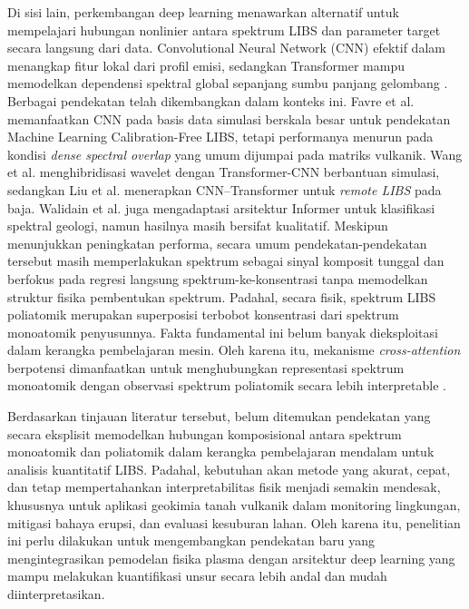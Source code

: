 Di sisi lain, perkembangan deep learning menawarkan alternatif untuk mempelajari hubungan nonlinier antara spektrum LIBS dan parameter target secara langsung dari data. Convolutional Neural Network (CNN) efektif dalam menangkap fitur lokal dari profil emisi, sedangkan Transformer mampu memodelkan dependensi spektral global sepanjang sumbu panjang gelombang \citep{liu_remote_2026}. Berbagai pendekatan telah dikembangkan dalam konteks ini. Favre et al. \citep{favre_towards_2025} memanfaatkan CNN pada basis data simulasi berskala besar untuk pendekatan Machine Learning Calibration-Free LIBS, tetapi performanya menurun pada kondisi \textit{dense spectral overlap} yang umum dijumpai pada matriks vulkanik. Wang et al. \citep{wang_simulation_2024} menghibridisasi wavelet dengan Transformer-CNN berbantuan simulasi, sedangkan Liu et al. \citep{liu_remote_2026} menerapkan CNN--Transformer untuk \textit{remote LIBS} pada baja. Walidain et al. \citep{walidain_informer-based_2026} juga mengadaptasi arsitektur Informer untuk klasifikasi spektral geologi, namun hasilnya masih bersifat kualitatif. Meskipun menunjukkan peningkatan performa, secara umum pendekatan-pendekatan tersebut masih memperlakukan spektrum sebagai sinyal komposit tunggal dan berfokus pada regresi langsung spektrum-ke-konsentrasi tanpa memodelkan struktur fisika pembentukan spektrum. Padahal, secara fisik, spektrum LIBS poliatomik merupakan superposisi terbobot konsentrasi dari spektrum monoatomik penyusunnya. Fakta fundamental ini belum banyak dieksploitasi dalam kerangka pembelajaran mesin. Oleh karena itu, mekanisme \textit{cross-attention} berpotensi dimanfaatkan untuk menghubungkan representasi spektrum monoatomik dengan observasi spektrum poliatomik secara lebih interpretable \citep{vaswani_attention_2017}.

Berdasarkan tinjauan literatur tersebut, belum ditemukan pendekatan yang secara eksplisit memodelkan hubungan komposisional antara spektrum monoatomik dan poliatomik dalam kerangka pembelajaran mendalam untuk analisis kuantitatif LIBS. Padahal, kebutuhan akan metode yang akurat, cepat, dan tetap mempertahankan interpretabilitas fisik menjadi semakin mendesak, khususnya untuk aplikasi geokimia tanah vulkanik dalam monitoring lingkungan, mitigasi bahaya erupsi, dan evaluasi kesuburan lahan. Oleh karena itu, penelitian ini perlu dilakukan untuk mengembangkan pendekatan baru yang mengintegrasikan pemodelan fisika plasma dengan arsitektur deep learning yang mampu melakukan kuantifikasi unsur secara lebih andal dan mudah diinterpretasikan.

